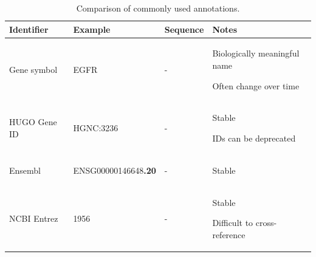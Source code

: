 
\begin{SingleSpace}
\begin{table}[tbp]
    \centering
    \caption{Comparison of commonly used annotations.}
    \label{tab:intro-anno}

    \footnotesize
    \begin{subtable}{1\linewidth}
        \centering
        \label{tab:intro-anno-gene}
        \begin{tabular}{lllp{15em}}
            \toprule
            Identifier      & Example   & Sequence  & Notes \\
            \midrule
            Gene symbol     & EGFR      & -         &
            \begin{tablist}
                \item Biologically meaningful name
                \item Often change over time
            \end{tablist}\\
            HUGO Gene ID    & HGNC:3236 & -         &
            \begin{tablist}
                \item Stable
                \item IDs can be deprecated
            \end{tablist}\\
            Ensembl         & ENSG00000146648\textbf{.20} & - &
            \begin{tablist}
                \item Stable
            \end{tablist} \\
            NCBI Entrez	    & 1956      & -         &
            \begin{tablist}
                \item Stable
                \item Difficult to cross-reference
            \end{tablist} \\
            \bottomrule
        \end{tabular}
    \end{subtable}


\end{table}
\end{SingleSpace}
